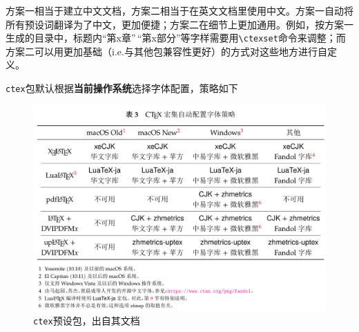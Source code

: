 \documentclass[10pt,openany]{book}
\begin{document}


方案一相当于建立中文文档，方案二相当于在英文文档里使用中文。方案一自动将所有预设词翻译为了中文，更加便捷；方案二在细节上更加通用。例如，按方案一生成的目录中，标题内“第x章”\,“第x部分”等字样需要用\texttt{\textbackslash{}ctexset}命令来调整；而方案二可以用更加基础（i.e.与其他包兼容性更好）的方式对这些地方进行自定义。

\texttt{ctex}包默认根据\textbf{当前操作系统}选择字体配置，策略如下

\begin{figure}[H]
    \centering
    \includegraphics[width=\linewidth]{data/ctex.png}
    \caption{\texttt{ctex}预设包，出自其文档}
\end{figure}
\end{document}
